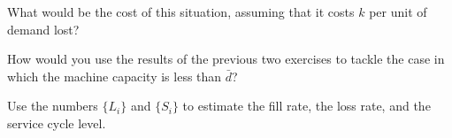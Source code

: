 \begin{exercise}
  What would be the cost of this situation, assuming that it costs $k$
  per unit of demand lost? 

\end{exercise}

\begin{exercise}
  How would you use the results of the previous two exercises to tackle the case in which the machine capacity is less than $\bar d$?

\end{exercise}


\begin{exercise}
  Use the numbers $\{L_i\}$ and $\{S_i\}$ to estimate the fill rate,
  the loss rate, and the service cycle level.

\end{exercise}

